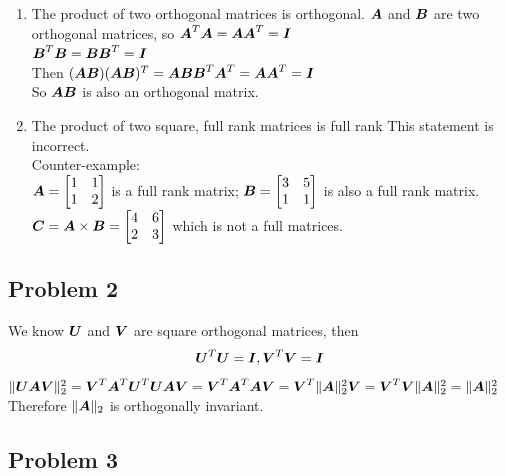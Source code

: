 \documentclass{article}
\begin{document}
\begin{enumerate}
\item The product of two orthogonal matrices is orthogonal.
$\mA $  and  $\mB $ are two orthogonal matrices, so \newline 
$\mA^T\mA=\mA\mA^T=\mI $\\
$\mB^T\mB=\mB\mB^T=\mI $\\
Then $(\mA\mB)(\mA\mB)^T=\mA\mB\mB^T\mA^T=\mA\mA^T=\mI $ \\
So $\mA\mB $ is also an orthogonal matrix. \\

\item The product of two square, full rank matrices is full rank
This statement is incorrect. \\
Counter-example:\\
$\mA=\bmat{1&1\\1&2}$ is a full rank matrix; \newline
$\mB=\bmat{3&5\\1&1}$ is also a full rank matrix.\newline
$\mC = \mA\times\mB = \bmat{4&6\\2&3} $ which is not a full matrices.  \newline


\end{enumerate} 

\hypertarget{problem_2_prove_or_disprove_3}{}
\subsection*{{Problem 2}}
\label{problem_2_prove_or_disprove_3}
We know $\mU$ and $\mV$ are square orthogonal matrices, then
\begin{align}
\mU^T\mU=\mI,  \mV^T\mV=\mI 
\end{align}
$\|\mU\mA\mV\|_2^2
=\mV^T\mA^T\mU^T\mU\mA\mV \\
= \mV^T\mA^T\mA\mV \\
= \mV^T\|\mA\|_2^2\mV \\
=\mV^T\mV\|\mA\|_2^2 \\
=\|\mA\|_2^2 \\$
Therefore $\|\mA\|_2 $ is orthogonally invariant. \\

\hypertarget{problem_3_prove_or_disprove_3}{}
\subsection*{{Problem 3}}
\label{problem_1_prove_or_disprove_3}
\end{document}

